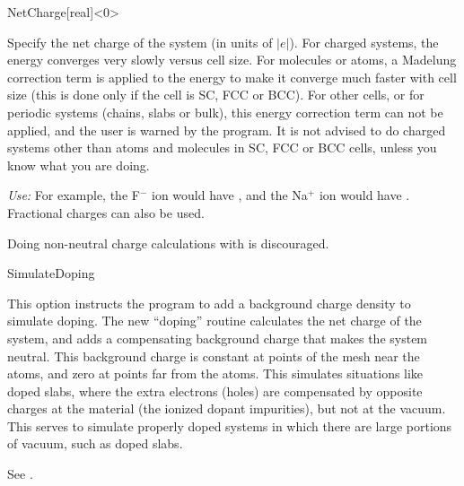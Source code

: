 \begin{fdfentry}{NetCharge}[real]<$0$>%
  
    Specify the net charge of the system (in units of $|e|$).  For
    charged systems, the energy converges very slowly versus cell
    size. For molecules or atoms, a Madelung correction term is applied
    to the energy to make it converge much faster with cell size (this
    is done only if the cell is SC, FCC or BCC). For other cells, or for
    periodic systems (chains, slabs or bulk), this energy correction
    term can not be applied, and the user is warned by the program. It
    is not advised to do charged systems other than atoms and molecules
    in SC, FCC or BCC cells, unless you know what you are doing.
  
    \textit{Use:} For example, the F$^-$ ion would have 
     , and the Na$^+$ ion would have  .
    Fractional charges can also be used.
  
    \note Doing non-neutral charge calculations with
     is discouraged.
  
  \end{fdfentry}
  
  
  \begin{fdflogicalF}{SimulateDoping}
  
    This option instructs the program to add a background charge density
    to simulate doping.  The new ``doping'' routine calculates the net
    charge of the system, and adds a compensating background charge that
    makes the system neutral. This background charge is constant at
    points of the mesh near the atoms, and zero at points far from the
    atoms. This simulates situations like doped slabs, where the extra
    electrons (holes) are compensated by opposite charges at the material
    (the ionized dopant impurities), but not at the vacuum. This serves
    to simulate properly doped systems in which there are large portions
    of vacuum, such as doped slabs.
  
    See .
  
  \end{fdflogicalF}
  
